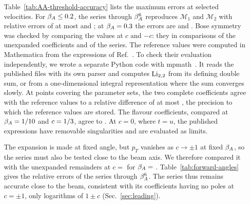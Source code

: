 Table~\ref{tab:AA-threshold-accuracy} lists the maximum errors at selected velocities. For $\beta_A\leq0.2$, the series through $\beta_A^6$ reproduces $\mathcal M_1$ and $\mathcal M_2$ with relative errors of at most \PoneErrLePointTwo{} and \PtwoErrLePointTwo{}; at $\beta_A=0.3$ the errors are \PoneErrAtPointThree{} and \PtwoErrAtPointThree{}.
Bose symmetry was checked by comparing the values at $c$ and $-c$: they \BoseStatement{} in \AngularReferenceChecks{} comparisons of the unexpanded coefficients and \AngularSeriesChecks{} of the series.
The reference values were computed in Mathematica from the expressions of Ref.~\cite{Bhattacharya:2019bmd}. To check their evaluation independently, we wrote a separate Python code with mpmath~\cite{mpmath}. It reads the published files with its own parser and computes $\operatorname{Li}_{2,2}$ from its defining double sum, or from a one-dimensional integral representation where the sum converges slowly. At \ExactPointCount{} points covering the \ExactParameterSets{} parameter sets, the two complete coefficients agree with the reference values to a relative difference of at most \ExactMaxComplete{}, the precision to which the reference values are stored. The \ExactComponentCount{} flavour coefficients, compared at $\beta_A=1/10$ and $c=1/3$, agree to \ExactMaxComponent{}. At $c=0$, where $t=u$, the published expressions have removable singularities and are evaluated as limits.

The expansion is made at fixed angle, but $p_T$ vanishes as $c\to\pm1$ at fixed $\beta_A$, so the series must also be tested close to the beam axis. We therefore compared it with the unexpanded remainders at $c=$ \ForwardCosList{} for $\beta_A=$ \ForwardBetaList{}. Table~\ref{tab:forward-angles} gives the relative errors of the series through $\beta_A^6$. \ForwardSummary{} The series thus remains accurate close to the beam, consistent with its coefficients having no poles at $c=\pm1$, only logarithms of $1\pm c$ (Sec.~\ref{sec:leading}).

